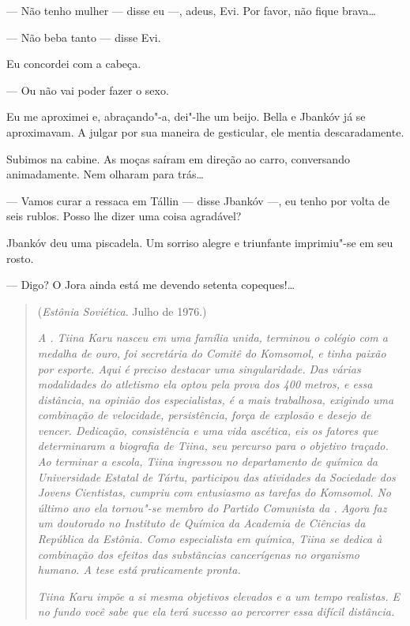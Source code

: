 --- Não tenho mulher --- disse eu ---, adeus, Evi.
Por favor, não fique brava\ldots{}

--- Não beba tanto --- disse Evi.

Eu concordei com a cabeça.

--- Ou não vai poder fazer o sexo.

Eu me aproximei e, abraçando"-a, dei"-lhe um beijo. Bella e Jbankóv já se
aproximavam. A julgar por sua maneira de gesticular, ele mentia
descaradamente.

Subimos na cabine. As moças saíram em direção ao carro, conversando
animadamente. Nem olharam para trás\ldots{}

--- Vamos curar a ressaca em Tállin --- disse Jbankóv
---, eu tenho por volta de seis rublos. Posso lhe dizer uma coisa
agradável?

Jbankóv deu uma piscadela. Um sorriso alegre e triunfante imprimiu"-se em
seu rosto.

--- Digo? O Jora ainda está me devendo setenta copeques!\ldots{}

\clearpage
\thispagestyle{empty}

\movetooddpage
\begin{center}
{}
\end{center}

\begin{quotation}
\begin{flushright}
(\emph{Estônia Soviética}. Julho de 1976.)
\end{flushright}
\vspace{4pt}
\noindent\emph{A . Tiina Karu nasceu em uma família unida,
terminou o colégio com a medalha de ouro, foi secretária do Comitê do
Komsomol, e tinha paixão por esporte. Aqui é preciso destacar uma
singularidade. Das várias modalidades do atletismo ela optou pela prova
dos 400 metros, e essa distância, na opinião dos especialistas, é a mais
trabalhosa, exigindo uma combinação de velocidade, persistência, força
de explosão e desejo de vencer. Dedicação, consistência e uma vida
ascética, eis os fatores que determinaram a biografia de Tiina, seu
percurso para o objetivo traçado. Ao terminar a escola, Tiina ingressou
no departamento de química da Universidade Estatal de Tártu, participou
das atividades da Sociedade dos Jovens Cientistas, cumpriu com
entusiasmo as tarefas do Komsomol. No último ano ela tornou"-se membro do
Partido Comunista da . Agora faz um doutorado no Instituto de
Química da Academia de Ciências da República da Estônia. Como
especialista em química, Tiina se dedica à combinação dos efeitos das
substâncias cancerígenas no organismo humano. A tese está praticamente
pronta.}

\emph{Tiina Karu impõe a si mesma objetivos elevados e a um tempo
realistas. E no fundo você sabe que ela terá sucesso ao percorrer essa
difícil distância.}
\end{quotation}

